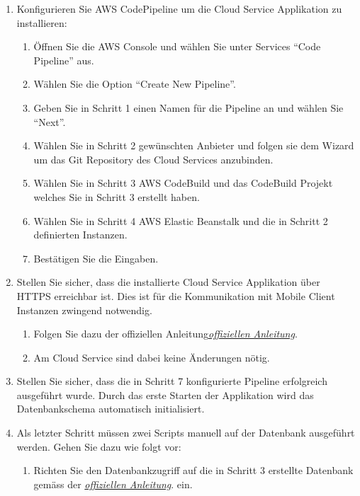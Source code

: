 \begin{enumerate}
    \item Konfigurieren Sie AWS CodePipeline um die Cloud Service Applikation zu installieren:
    \begin{enumerate}
        \item Öffnen Sie die AWS Console und wählen Sie unter Services ``Code Pipeline'' aus.
        \item Wählen Sie die Option ``Create New Pipeline''.
        \item Geben Sie in Schritt 1 einen Namen für die Pipeline an und wählen Sie ``Next''.
        \item Wählen Sie in Schritt 2 gewünschten Anbieter und folgen sie dem Wizard um das Git Repository des Cloud Services anzubinden.
        \item Wählen Sie in Schritt 3 AWS CodeBuild und das CodeBuild Projekt welches Sie in Schritt 3 erstellt haben.
        \item Wählen Sie in Schritt 4 AWS Elastic Beanstalk und die in Schritt 2 definierten Instanzen.
        \item Bestätigen Sie die Eingaben.
    \end{enumerate}
    \item Stellen Sie sicher, dass die installierte Cloud Service Applikation über HTTPS erreichbar ist. Dies ist für die Kommunikation mit Mobile Client Instanzen zwingend notwendig.
    \begin{enumerate}
        \item Folgen Sie dazu der offiziellen Anleitung\href{https://aws.amazon.com/premiumsupport/knowledge-center/elastic-beanstalk-https-configuration/}{\textit{offiziellen Anleitung}}\cite{aws-elastic-https}.
        \item Am Cloud Service sind dabei keine Änderungen nötig.
    \end{enumerate}
    \item Stellen Sie sicher, dass die in Schritt 7 konfigurierte Pipeline erfolgreich ausgeführt wurde.
    Durch das erste Starten der Applikation wird das Datenbankschema automatisch initialisiert.
    \item Als letzter Schritt müssen zwei Scripts manuell auf der Datenbank ausgeführt werden.
    Gehen Sie dazu wie folgt vor:
    \begin{enumerate}
        \item Richten Sie den Datenbankzugriff auf die in Schritt 3 erstellte Datenbank gemäss der \href{https://docs.aws.amazon.com/AmazonRDS/latest/UserGuide/USER_ConnectToPostgreSQLInstance.html}{\textit{offiziellen Anleitung}}\cite{aws-elastic-rds-access}. ein.

\end{enumerate}
\end{enumerate}
